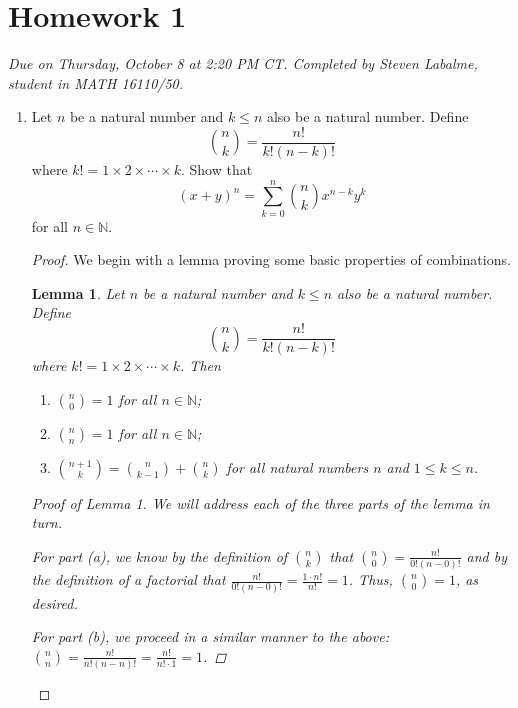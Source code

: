 \documentclass[titlepage]{article}
\newtheorem{lemma}{Lemma}
\theoremstyle{definition}
\newcommand{\N}{\mathbb{N}}
\begin{document}
\section{Homework 1}
\emph{Due on Thursday, October 8 at 2:20 PM CT. Completed by Steven Labalme, student in MATH 16110/50.}
\begin{enumerate}
    \item Let $n$ be a natural number and $k\leq n$ also be a natural number. Define
    \begin{equation*}
        \binom{n}{k} = \frac{n!}{k!(n-k)!}
    \end{equation*}
    where $k!=1\times 2\times\cdots\times k$. Show that
    \begin{equation*}
        (x+y)^n = \sum_{k=0}^n\binom{n}{k}x^{n-k}y^k
    \end{equation*}
    for all $n\in\N$.\par
    \begin{proof}
        We begin with a lemma proving some basic properties of combinations.
        \setcounter{lemma}{0}
        \begin{lemma}
            Let $n$ be a natural number and $k\leq n$ also be a natural number. Define
            \begin{equation*}
                \binom{n}{k} = \frac{n!}{k!(n-k)!}
            \end{equation*}
            where $k!=1\times 2\times\cdots\times k$. Then
            \begin{enumerate}[label={\alph*\textup{)}}]
                \item $\binom{n}{0}=1$ for all $n\in\N$;
                \item $\binom{n}{n}=1$ for all $n\in\N$;
                \item $\binom{n+1}{k}=\binom{n}{k-1}+\binom{n}{k}$ for all natural numbers $n$ and $1\leq k\leq n$.
            \end{enumerate}
            \begin{proof}[Proof of Lemma 1]
                We will address each of the three parts of the lemma in turn.\par
                For part (a), we know by the definition of $\binom{n}{k}$ that $\binom{n}{0}=\frac{n!}{0!(n-0)!}$ and by the definition of a factorial that $\frac{n!}{0!(n-0)!}=\frac{1\cdot n!}{n!}=1$. Thus, $\binom{n}{0}=1$, as desired.\par
                For part (b), we proceed in a similar manner to the above: $\binom{n}{n}=\frac{n!}{n!(n-n)!}=\frac{n!}{n!\cdot 1}=1$.\par

\end{proof}
\end{lemma}
\end{proof}
\end{enumerate}
\end{document}
